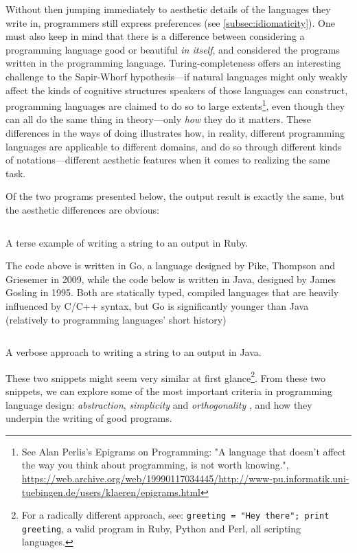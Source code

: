 Without  then jumping immediately to aesthetic details of the languages they write in, programmers still express preferences (see \ref{subsec:idiomaticity}). One must also keep in mind that there is a difference between considering a programming language good or beautiful \emph{in itself}, and considered the programs written in the programming language. Turing-completeness offers an interesting challenge to the Sapir-Whorf hypothesis—if natural languages might only weakly affect the kinds of cognitive structures speakers of those languages can construct, programming languages are claimed to do so to large extents\footnote{See Alan Perlis's Epigrams on Programming: "A language that doesn't affect the way you think about programming, is not worth knowing.", \url{https://web.archive.org/web/19990117034445/http://www-pu.informatik.uni-tuebingen.de/users/klaeren/epigrams.html}}, even though they can all do the same thing in theory—only \emph{how} they do it matters. These differences in the ways of doing illustrates how, in reality, different programming languages are applicable to different domains, and do so through different kinds of notations—different aesthetic features when it comes to realizing the same task.

Of the two programs presented below, the output result is exactly the same, but the aesthetic differences are obvious:

\begin{listing}
  \inputminted{ruby}{./corpus/hello.rb}
  \caption{A terse example of writing a string to an output in Ruby.}
  \label{code:hello-ruby}

\end{listing}

The code above is written in Go, a language designed by Pike, Thompson and Griesemer in 2009, while the code below is written in Java, designed by James Gosling in 1995. Both are statically typed, compiled languages that are heavily influenced by C/C++ syntax, but Go is significantly younger than Java (relatively to programming languages' short history)

\begin{listing}
  \inputminted{javaj}{./corpus/hello.java}
  \caption{A verbose approach to writing a string to an output in Java.}
  \label{code:hello-java}
\end{listing}

These two snippets might seem very similar at first glance\footnote{For a radically different approach, see: \lstinline{greeting = "Hey there"; print greeting}, a valid program in Ruby, Python and Perl, all scripting languages.}. From these two snippets, we can explore some of the most important criteria in programming language design: \emph{abstraction}, \emph{simplicity} and \emph{orthogonality} \citep{sebesta_concepts_2018}, and how they underpin the writing of good programs.

